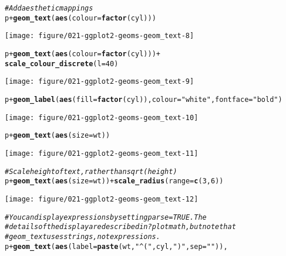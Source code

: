 \documentclass[a4paper,titlepage]{tufte-handout}\usepackage[]{graphicx}\usepackage[]{color}
\makeatletter
\def\maxwidth{ %
  \ifdim\Gin@nat@width>\linewidth
    \linewidth
  \else
    \Gin@nat@width
  \fi
}
\newcommand{\hlnum}[1]{\textcolor[rgb]{0.686,0.059,0.569}{#1}}%
\newcommand{\hlstr}[1]{\textcolor[rgb]{0.192,0.494,0.8}{#1}}%
\newcommand{\hlcom}[1]{\textcolor[rgb]{0.678,0.584,0.686}{\textit{#1}}}%
\newcommand{\hlopt}[1]{\textcolor[rgb]{0,0,0}{#1}}%
\newcommand{\hlstd}[1]{\textcolor[rgb]{0.345,0.345,0.345}{#1}}%
\newcommand{\hlkwc}[1]{\textcolor[rgb]{0.333,0.667,0.333}{#1}}%
\newcommand{\hlkwd}[1]{\textcolor[rgb]{0.737,0.353,0.396}{\textbf{#1}}}%
\newenvironment{kframe}{%
 \def\at@end@of@kframe{}%
 \ifinner\ifhmode%
  \def\at@end@of@kframe{\end{minipage}}%
  \begin{minipage}{\columnwidth}%
 \fi\fi%
 \def\FrameCommand##1{\hskip\@totalleftmargin \hskip-\fboxsep
 \colorbox{shadecolor}{##1}\hskip-\fboxsep
     \hskip-\linewidth \hskip-\@totalleftmargin \hskip\columnwidth}%
 \MakeFramed {\advance\hsize-\width
   \@totalleftmargin\z@ \linewidth\hsize
   \@setminipage}}%
 {\par\unskip\endMakeFramed%
 \at@end@of@kframe}
\newenvironment{knitrout}{}{} %
\makeatother
\begin{document}
\begin{knitrout}
\begin{kframe}
\begin{alltt}
\hlcom{# Add aesthetic mappings}
\hlstd{p} \hlopt{+} \hlkwd{geom_text}\hlstd{(}\hlkwd{aes}\hlstd{(}\hlkwc{colour} \hlstd{=} \hlkwd{factor}\hlstd{(cyl)))}
\end{alltt}
\end{kframe}
\texttt{[image: figure/021-ggplot2-geoms-geom\_text-8]} 
\begin{kframe}\begin{alltt}
\hlstd{p} \hlopt{+} \hlkwd{geom_text}\hlstd{(}\hlkwd{aes}\hlstd{(}\hlkwc{colour} \hlstd{=} \hlkwd{factor}\hlstd{(cyl)))} \hlopt{+}
  \hlkwd{scale_colour_discrete}\hlstd{(}\hlkwc{l} \hlstd{=} \hlnum{40}\hlstd{)}
\end{alltt}
\end{kframe}
\texttt{[image: figure/021-ggplot2-geoms-geom\_text-9]} 
\begin{kframe}\begin{alltt}
\hlstd{p} \hlopt{+} \hlkwd{geom_label}\hlstd{(}\hlkwd{aes}\hlstd{(}\hlkwc{fill} \hlstd{=} \hlkwd{factor}\hlstd{(cyl)),} \hlkwc{colour} \hlstd{=} \hlstr{"white"}\hlstd{,} \hlkwc{fontface} \hlstd{=} \hlstr{"bold"}\hlstd{)}
\end{alltt}
\end{kframe}
\texttt{[image: figure/021-ggplot2-geoms-geom\_text-10]} 
\begin{kframe}\begin{alltt}
\hlstd{p} \hlopt{+} \hlkwd{geom_text}\hlstd{(}\hlkwd{aes}\hlstd{(}\hlkwc{size} \hlstd{= wt))}
\end{alltt}
\end{kframe}
\texttt{[image: figure/021-ggplot2-geoms-geom\_text-11]} 
\begin{kframe}\begin{alltt}
\hlcom{# Scale height of text, rather than sqrt(height)}
\hlstd{p} \hlopt{+} \hlkwd{geom_text}\hlstd{(}\hlkwd{aes}\hlstd{(}\hlkwc{size} \hlstd{= wt))} \hlopt{+} \hlkwd{scale_radius}\hlstd{(}\hlkwc{range} \hlstd{=} \hlkwd{c}\hlstd{(}\hlnum{3}\hlstd{,}\hlnum{6}\hlstd{))}
\end{alltt}
\end{kframe}
\texttt{[image: figure/021-ggplot2-geoms-geom\_text-12]} 
\begin{kframe}\begin{alltt}
\hlcom{# You can display expressions by setting parse = TRUE.  The}
\hlcom{# details of the display are described in ?plotmath, but note that}
\hlcom{# geom_text uses strings, not expressions.}
\hlstd{p} \hlopt{+} \hlkwd{geom_text}\hlstd{(}\hlkwd{aes}\hlstd{(}\hlkwc{label} \hlstd{=} \hlkwd{paste}\hlstd{(wt,} \hlstr{"^("}\hlstd{, cyl,} \hlstr{")"}\hlstd{,} \hlkwc{sep} \hlstd{=} \hlstr{""}\hlstd{)),}

\end{alltt}
\end{kframe}
\end{knitrout}
\end{document}
